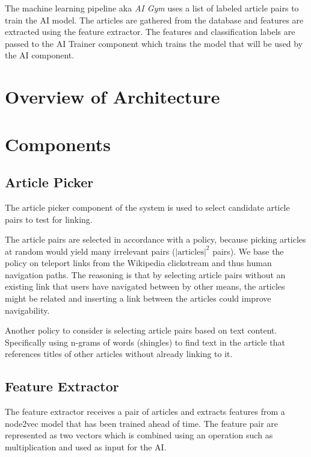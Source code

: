 The machine learning pipeline aka \textit{AI Gym\texttrademark} uses a list of labeled article pairs to train the AI model. The articles are gathered from the database and features are extracted using the feature extractor. The features and classification labels are passed to the AI Trainer component which trains the model that will be used by the AI component.


\section{Overview of Architecture}\label{sec:architecture}

\section{Components}

\subsection{Article Picker}
The article picker component of the system is used to select candidate article pairs to test for linking.

The article pairs are selected in accordance with a policy, because picking articles at random would yield many irrelevant pairs ($\left\vert{\text{articles}}\right\vert ^{2}$ pairs). We base the policy on teleport links from the Wikipedia clickstream and thus human navigation paths. The reasoning is that by selecting article pairs without an existing link that users have navigated between by other means, the articles might be related and inserting a link between the articles could improve navigability.

Another policy to consider is selecting article pairs based on text content. Specifically using n-grams of words (shingles) to find text in the article that references titles of other articles without already linking to it. 


\subsection{Feature Extractor}
The feature extractor receives a pair of articles and extracts features from a node2vec model that has been trained ahead of time. The feature pair are represented as two vectors which is combined using an operation such as multiplication  and used as input for the AI.






